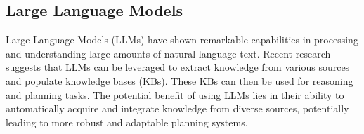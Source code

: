 \subsection{Large Language Models}
Large Language Models (LLMs) have shown remarkable capabilities in processing and understanding large amounts of natural language text.  Recent research suggests that LLMs can be leveraged to extract knowledge from various sources and populate knowledge bases (KBs). These KBs can then be used for reasoning and planning tasks. The potential benefit of using LLMs lies in their ability to automatically acquire and integrate knowledge from diverse sources, potentially leading to more robust and adaptable planning systems.








